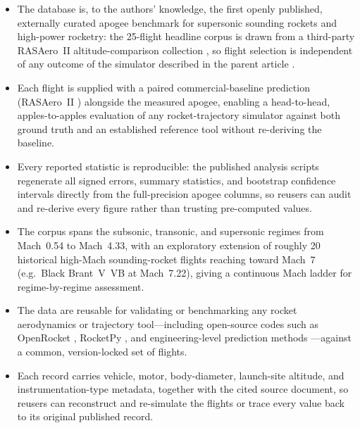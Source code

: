 \begin{itemize}

  \item The database is, to the authors' knowledge, the first openly published,
        externally curated apogee benchmark for supersonic sounding rockets and
        high-power rocketry: the 25-flight headline corpus is drawn from a
        third-party RASAero~II altitude-comparison collection \cite{rogers2015},
        so flight selection is independent of any outcome of the simulator
        described in the parent article \cite{yu2026jsr}.

  \item Each flight is supplied with a paired commercial-baseline prediction
        (RASAero~II \cite{rogers2015}) alongside the measured apogee, enabling a
        head-to-head, apples-to-apples evaluation of any rocket-trajectory
        simulator against both ground truth and an established reference tool
        without re-deriving the baseline.

  \item Every reported statistic is reproducible: the published analysis scripts
        regenerate all signed errors, summary statistics, and bootstrap
        confidence intervals directly from the full-precision apogee columns, so
        reusers can audit and re-derive every figure rather than trusting
        pre-computed values.

  \item The corpus spans the subsonic, transonic, and supersonic regimes from
        Mach~0.54 to Mach~4.33, with an exploratory extension of roughly 20
        historical high-Mach sounding-rocket flights reaching toward Mach~7
        (e.g.\ Black Brant~V~VB at Mach~7.22), giving a continuous Mach ladder
        for regime-by-regime assessment.

  \item The data are reusable for validating or benchmarking any rocket
        aerodynamics or trajectory tool---including open-source codes such as
        OpenRocket \cite{niskanen2009}, RocketPy \cite{rocketpy2021}, and
        engineering-level prediction methods \cite{sooy2005}---against a common,
        version-locked set of flights.

  \item Each record carries vehicle, motor, body-diameter, launch-site altitude,
        and instrumentation-type metadata, together with the cited source
        document, so reusers can reconstruct and re-simulate the flights or trace
        every value back to its original published record.

\end{itemize}
